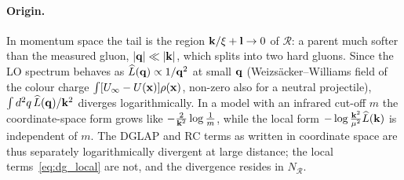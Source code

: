 \paragraph{Origin.} In momentum space the tail is the region $\mathbf{k}/\xi+\mathbf{l}\to0$ of $\mathcal R$: a parent much softer than the measured gluon, $|\mathbf{q}|\ll|\mathbf{k}|$, which splits into two hard gluons. Since the LO spectrum behaves as $\widehat L(\mathbf{q})\propto1/\mathbf{q}^2$ at small $\mathbf{q}$ (Weizs\"acker--Williams field of the colour charge $\int[U_\infty-U(\mathbf{x})]\rho(\mathbf{x})$, non-zero also for a neutral projectile), $\int d^2q\,\widehat L(\mathbf{q})/\mathbf{k}^2$ diverges logarithmically. In a model with an infrared cut-off $m$ the coordinate-space form grows like $-\frac{2}{\mathbf{k}^2}\log\frac1m$, while the local form $-\log\frac{\mathbf{k}^2}{\mu^2}\widehat L(\mathbf{k})$ is independent of $m$. The DGLAP and RC terms as written in coordinate space are thus separately logarithmically divergent at large distance; the local terms~\eqref{eq:dg_local} are not, and the divergence resides in $N_{\mathcal R}$.

